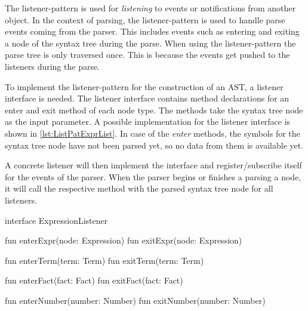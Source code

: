 The listener-pattern is used for \textit{listening} to events or notifications from another object. In the context of parsing, the listener-pattern is used to handle parse events coming from the parser. This includes events such as entering and exiting a node of the syntax tree during the parse. When using the listener-pattern the parse tree is only traversed once. This is because the events get pushed to the listeners during the parse. 

To implement the listener-pattern for the construction of an AST, a listener interface is needed. The listener interface contains method declarations for an enter and exit method of each node type. The methods take the syntax tree node as the input parameter. A possible implementation for the listener interface is shown in \ref{lst:ListPatExprList}.  In case of the \textit{enter} methods, the symbols for the syntax tree node have not been parsed yet, so no data from them is available yet.

A concrete listener will then implement the interface and register/subscribe itself for the events of the parser. When the parser begins or finishes a parsing a node, it will call the respective method with the parsed syntax tree node for all listeners. 

\begin{KotlinCode}[float,numbers=none,caption=Implementation of the \texttt{ExpressionListener} interface., label=lst:ListPatExprList]
interface ExpressionListener {
    fun enterExpr(node: Expression)
    fun exitExpr(node: Expression)

    fun enterTerm(term: Term)
    fun exitTerm(term: Term)

    fun enterFact(fact: Fact)
    fun exitFact(fact: Fact)

    fun enterNumber(number: Number)
    fun exitNumber(number: Number)
}
  \end{KotlinCode}

